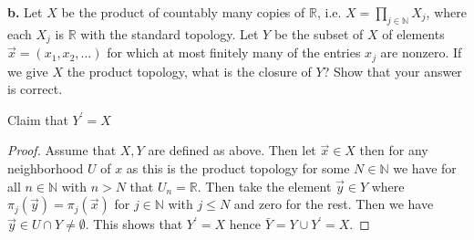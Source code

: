 \documentclass{amsart}
\theoremstyle{plain}
\theoremstyle{definition}
\theoremstyle{remark}
\begin{document}
{\bfseries b.} Let $X$ be the product of countably many copies of $\mathbb R$, i.e. $X = \prod _{j\in \mathbb N } X_j$, where each $X_j$ is $\mathbb R$ with the standard topology. Let $Y$ be the subset of $X$ of elements $\vec{x} = ( x_1 , x_2 , . . . )$ for which at most finitely many of the entries $x_j$ are nonzero. If we give $X$ the product topology, what is the closure of $Y$? Show that your answer is correct. 


Claim that $Y^\prime=X$
\begin{proof}
    Assume that $X,Y$ are defined as above. Then let $\vec{x} \in X$ then for any neighborhood $U$ of $x$ as this is the product topology for some $N\in \mathbb{N}$ we have for all $n\in \mathbb{N}$ with $n>N$ that $U_n=\mathbb{R}$. Then take the element $\vec{y} \in Y$ where $\pi_j(\vec{y})=\pi_j(\vec{x})$ for $j\in \mathbb{N}$ with $j\leq N$ and zero for the rest. Then we have $\vec{y}\in U\cap Y\not = \emptyset$. This shows that $Y^\prime=X$ hence $\bar Y=Y\cup Y^\prime = X$. 
\end{proof}

 
\end{document}
